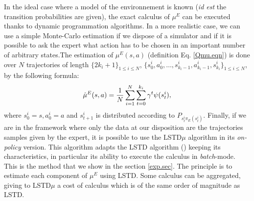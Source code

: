 \documentclass{article}
\begin{document}
In the ideal case where a model of the environnement is known (\textit{id est} the transition probabilities are given), the exact calculus of $\mu^E$ can be executed thanks to dynamic programmation algorithms. In a more realistic case, we can use a simple Monte-Carlo estimation if we dispose of a simulator and if it is possible to ask the expert what action has to be chosen in an important number of arbitrary states.The estimation of $\mu^E(s,a)$ (definition Eq. \eqref{Qmu.eqn}) is done over $N$ trajectories of length $\{2k_i+1\}_{1\leq i \leq N}$, $\{s^i_0,a^i_0,\dots,s^i_{k_i-1},a^i_{k_i-1},s^i_{k_i}\}_{1\leq i \leq N}$, by the following formula:
\begin{equation}
\hat\mu^E(s,a) = {1\over N}\sum_{i=1}^{N}\sum^{k_i}_{t=0}\gamma^t\psi(s^i_t),
\end{equation}
where $s^i_0=s, a^i_0=a$ and $s^i_{t+1}$ is distributed according to $P_{s^i_t\pi_E(s^i_t)}$.
Finally, if we are in the framework where only the data at our disposition are the trajectories samples given by the expert, it is possible to use the LSTD$\mu$ algorithm \citep{klein2011batch} in its \emph{on-policy} version. This algorithm adapts the LSTD algorithm (\cite{bradtke1996linear}) keeping its characteristics, in particular its ability to execute the calculus in  {\it batch}-mode. This is the method that we show in the section \ref{exp.sec}. The principle is to estimate each component of $\mu^E$ using LSTD. Some calculus can be aggregated, giving to LSTD$\mu$ a cost of calculus which is of the same order of magnitude as LSTD.
\end{document}
